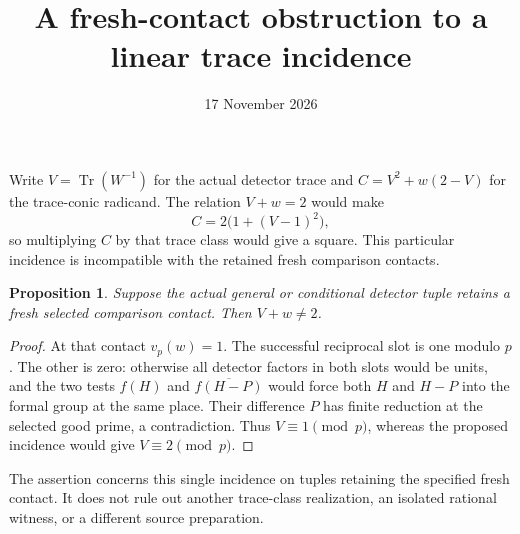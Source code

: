 \documentclass[11pt,a4paper]{article}
\title{A fresh-contact obstruction to a linear trace incidence}
\author{}\date{17 November 2026}
\newtheorem{proposition}{Proposition}
\begin{document}
\maketitle
Write $V=\operatorname{Tr}(W^{-1})$ for the actual detector trace
and $C=V^2+w(2-V)$ for the trace-conic radicand. The relation
$V+w=2$ would make
\[
 C=2\bigl(1+(V-1)^2\bigr),
\]
so multiplying $C$ by that trace class would give a square.
This particular incidence is incompatible with the retained fresh
comparison contacts.
\begin{proposition}
Suppose the actual general or conditional detector tuple retains
a fresh selected comparison contact. Then $V+w\ne2$.
\end{proposition}
\begin{proof}
At that contact $v_p(w)=1$. The successful reciprocal slot is one
modulo $p$. The other is zero: otherwise all detector factors in
both slots would be units, and the two tests $f(H)$ and
$\overline{f(H-P)}$ would force both $H$ and $H-P$ into the formal
group at the same place. Their difference $P$ has finite reduction
at the selected good prime, a contradiction. Thus $V\equiv1\pmod p$,
whereas the proposed incidence would give $V\equiv2\pmod p$.
\end{proof}
The assertion concerns this single incidence on tuples retaining the
specified fresh contact. It does not rule out another trace-class
realization, an isolated rational witness, or a different source
preparation.
\end{document}
